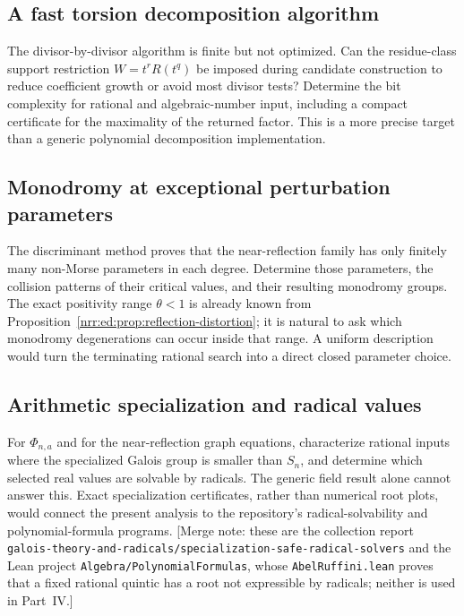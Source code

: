 \documentclass[11pt,letterpaper]{article}
\theoremstyle{definition}
\theoremstyle{remark}
\begin{document}
\subsection{A fast torsion decomposition algorithm}

The divisor-by-divisor algorithm is finite but not optimized. Can the residue-class
support restriction $W=t^rR(t^q)$ be imposed during candidate construction to reduce
coefficient growth or avoid most divisor tests? Determine the bit complexity for
rational and algebraic-number input, including a compact certificate for the
maximality of the returned factor. This is a more precise target than a generic
polynomial decomposition implementation.

\subsection{Monodromy at exceptional perturbation parameters}

The discriminant method proves that the near-reflection family has only finitely
many non-Morse parameters in each degree. Determine those parameters, the collision
patterns of their critical values, and their resulting monodromy groups. The exact
positivity range $\theta<1$ is already known from Proposition~\ref{nrr:ed:prop:reflection-distortion};
it is natural to ask which monodromy degenerations can occur inside that range.
A uniform description would turn the terminating rational search into a direct
closed parameter choice.

\subsection{Arithmetic specialization and radical values}

For $\Phi_{n,a}$ and for the near-reflection graph equations, characterize rational
inputs where the specialized Galois group is smaller than $S_n$, and determine
which selected real values are solvable by radicals. The generic field result
alone cannot answer this. Exact specialization certificates, rather than numerical
root plots, would connect the present analysis to the repository's radical-solvability
and polynomial-formula programs. [Merge note: these are the collection report
\nolinkurl{galois-theory-and-radicals/specialization-safe-radical-solvers} and
the Lean project \nolinkurl{Algebra/PolynomialFormulas}, whose
\nolinkurl{AbelRuffini.lean} proves that a fixed rational quintic has a root
not expressible by radicals; neither is used in Part~IV.]
\end{document}
